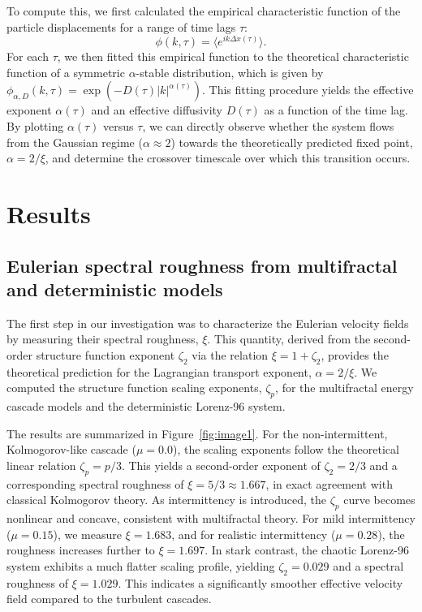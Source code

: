 \documentclass[]{article}
\begin{document}
To compute this, we first calculated the empirical characteristic function of the particle displacements for a range of time lags $\tau$:
\begin{equation}
\phi(k, \tau) = \langle e^{ik\Delta x(\tau)} \rangle.
\end{equation}
For each $\tau$, we then fitted this empirical function to the theoretical characteristic function of a symmetric $\alpha$-stable distribution, which is given by $\phi_{\alpha, D}(k, \tau) = \exp(-D(\tau)|k|^{\alpha(\tau)})$. This fitting procedure yields the effective exponent $\alpha(\tau)$ and an effective diffusivity $D(\tau)$ as a function of the time lag. By plotting $\alpha(\tau)$ versus $\tau$, we can directly observe whether the system flows from the Gaussian regime ($\alpha \approx 2$) towards the theoretically predicted fixed point, $\alpha = 2/\xi$, and determine the crossover timescale over which this transition occurs.

\section{Results}
\label{sec:results}
\subsection{Eulerian spectral roughness from multifractal and deterministic models}

The first step in our investigation was to characterize the Eulerian velocity fields by measuring their spectral roughness, $\xi$. This quantity, derived from the second-order structure function exponent $\zeta_2$ via the relation $\xi = 1 + \zeta_2$, provides the theoretical prediction for the Lagrangian transport exponent, $\alpha = 2/\xi$. We computed the structure function scaling exponents, $\zeta_p$, for the multifractal energy cascade models and the deterministic Lorenz-96 system.

The results are summarized in Figure~\ref{fig:image1}. For the non-intermittent, Kolmogorov-like cascade ($\mu=0.0$), the scaling exponents follow the theoretical linear relation $\zeta_p = p/3$. This yields a second-order exponent of $\zeta_2 = 2/3$ and a corresponding spectral roughness of $\xi = 5/3 \approx 1.667$, in exact agreement with classical Kolmogorov theory. As intermittency is introduced, the $\zeta_p$ curve becomes nonlinear and concave, consistent with multifractal theory. For mild intermittency ($\mu=0.15$), we measure $\xi = 1.683$, and for realistic intermittency ($\mu=0.28$), the roughness increases further to $\xi = 1.697$. In stark contrast, the chaotic Lorenz-96 system exhibits a much flatter scaling profile, yielding $\zeta_2 = 0.029$ and a spectral roughness of $\xi = 1.029$. This indicates a significantly smoother effective velocity field compared to the turbulent cascades.
\end{document}
